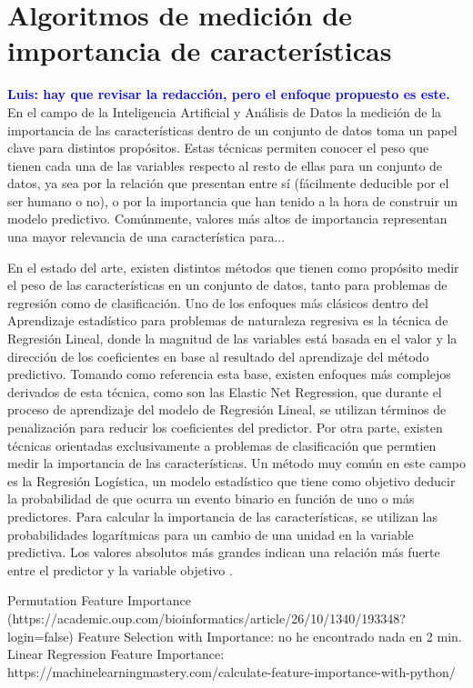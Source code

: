 \documentclass{uathesis-es}
\begin{document}
\section{Algoritmos de medición de importancia de características}
\label{SOAT_FEATURE_IMPORTANCE_METHODS}

\textcolor{blue}{\textbf{Luis: hay que revisar la redacción, pero el enfoque propuesto es este.}}\\


En el campo de la Inteligencia Artificial y Análisis de Datos la medición de la importancia de las características dentro de un conjunto de datos toma un papel clave para distintos propósitos. Estas técnicas permiten conocer el peso que tienen cada una de las variables respecto al resto de ellas para un conjunto de datos, ya sea por la relación que presentan entre sí (fácilmente deducible por el ser humano o no), o por la importancia que han tenido a la hora de construir un modelo predictivo. Comúnmente, valores más altos de importancia representan una mayor relevancia de una característica para...

En el estado del arte, existen distintos métodos que tienen como propósito medir el peso de las características en un conjunto de datos, tanto para problemas de regresión como de clasificación. Uno de los enfoques más clásicos dentro del Aprendizaje estadístico para problemas de naturaleza regresiva es la técnica de Regresión Lineal, donde la magnitud de las variables está basada en el valor y la dirección de los coeficientes en base al resultado del aprendizaje del método predictivo. Tomando como referencia esta base, existen enfoques más complejos derivados de esta técnica, como son las Elastic Net Regression, que durante el proceso de aprendizaje del modelo de Regresión Lineal, se utilizan términos de penalización para reducir los coeficientes del predictor. Por otra parte, existen técnicas orientadas exclusivamente a problemas de clasificación que permtien medir la importancia de las características. Un método muy común en este campo es la Regresión Logística, un modelo estadístico que tiene como objetivo deducir la probabilidad de que ocurra un evento binario en función de uno o más predictores. Para calcular la importancia de las características, se utilizan las probabilidades logarítmicas para un cambio de una unidad en la variable predictiva. Los valores absolutos más grandes indican una relación más fuerte entre el predictor y la variable objetivo \cite{Saarela2021}.

Permutation Feature Importance (https://academic.oup.com/bioinformatics/article/26/10/1340/193348?login=false)
Feature Selection with Importance: no he encontrado nada en 2 min.\\
Linear Regression Feature Importance: https://machinelearningmastery.com/calculate-feature-importance-with-python/
\end{document}
